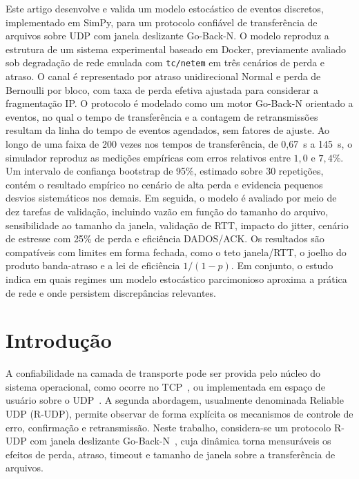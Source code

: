 \documentclass[12pt]{article}
\begin{document}
\begin{resumo}
  Este artigo desenvolve e valida um modelo estocástico de eventos discretos, implementado
  em SimPy, para um protocolo confiável de transferência de arquivos sobre UDP com janela
  deslizante Go-Back-N. O modelo reproduz a estrutura de um sistema experimental baseado
  em Docker, previamente avaliado sob degradação de rede emulada com \texttt{tc/netem} em
  três cenários de perda e atraso. O canal é representado por atraso unidirecional Normal
  e perda de Bernoulli por bloco, com taxa de perda efetiva ajustada para considerar a
  fragmentação IP. O protocolo é modelado como um motor Go-Back-N orientado a eventos, no
  qual o tempo de transferência e a contagem de retransmissões resultam da linha do tempo
  de eventos agendados, sem fatores de ajuste. Ao longo de uma faixa de 200 vezes nos
  tempos de transferência, de 0,67~s a 145~s, o simulador reproduz as medições empíricas
  com erros relativos entre $1{,}0$ e $7{,}4\%$. Um intervalo de confiança bootstrap de
  95\%, estimado sobre 30 repetições, contém o resultado empírico no cenário de alta perda
  e evidencia pequenos desvios sistemáticos nos demais. Em seguida, o modelo é avaliado
  por meio de dez tarefas de validação, incluindo vazão em função do tamanho do arquivo,
  sensibilidade ao tamanho da janela, validação de RTT, impacto do jitter, cenário de
  estresse com 25\% de perda e eficiência DADOS/ACK. Os resultados são compatíveis com
  limites em forma fechada, como o teto janela/RTT, o joelho do produto banda-atraso e a
  lei de eficiência $1/(1-p)$. Em conjunto, o estudo indica em quais regimes um modelo
  estocástico parcimonioso aproxima a prática de rede e onde persistem discrepâncias
  relevantes.
\end{resumo}

\section{Introdução}

A confiabilidade na camada de transporte pode ser provida pelo núcleo do sistema
operacional, como ocorre no TCP~\cite{rfc793}, ou implementada em espaço de usuário sobre o
UDP~\cite{rfc768}. A segunda abordagem, usualmente denominada Reliable UDP (R-UDP), permite
observar de forma explícita os mecanismos de controle de erro, confirmação e
retransmissão. Neste trabalho, considera-se um protocolo R-UDP com janela deslizante
Go-Back-N~\cite{kurose2017}, cuja dinâmica torna mensuráveis os efeitos de perda, atraso,
timeout e tamanho de janela sobre a transferência de arquivos.
\end{document}
